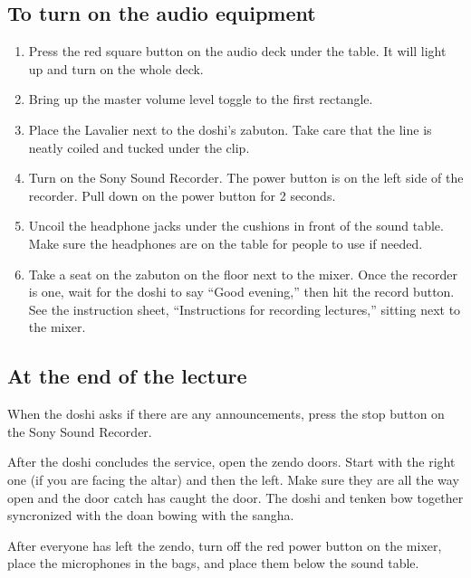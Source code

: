 \documentclass{kdo}
\begin{document}
\subsection*{To turn on the audio equipment}
\begin{enumerate}
\item Press the red square button on the audio deck under the table. It will
light up and turn on the whole deck.
\item Bring up the master volume level toggle to the first rectangle.
\item Place the Lavalier next to the doshi's zabuton. Take care that the line
is neatly coiled and tucked under the clip.
\item Turn on the Sony Sound Recorder. The power button is on the left side of
  the recorder. Pull down on the power button for 2 seconds.
\item Uncoil the headphone jacks under the cushions in front of the sound
  table. Make sure the headphones are on the table for people to use if needed.
\item Take a seat on the zabuton on the floor next to the mixer. Once the
  recorder is one, wait for the doshi to say ``Good evening,'' then hit the
  record button. See the instruction sheet, ``Instructions for recording
  lectures,'' sitting next to the mixer.
\end{enumerate}

\subsection*{At the end of the lecture}
When the doshi asks if there are any announcements, press the stop button on the
Sony Sound Recorder.

After the doshi concludes the service, open the zendo doors. Start with the
right one (if you are facing the altar) and then the left. Make sure they are
all the way open and the door catch has caught the door. The doshi and tenken
bow together syncronized with the doan bowing with the sangha.

After everyone has left the zendo, turn off the red power button on the mixer,
place the microphones in the bags, and place them below the sound table.
\end{document}
